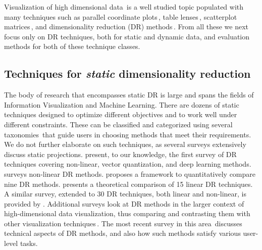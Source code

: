 
Visualization of high dimensional data\,\citep{Liu2017} is a well studied topic populated with many techniques such as parallel coordinate plots\,\citep{Inselberg1990}, table lenses\,\citep{Rao2003}, scatterplot matrices\,\citep{Becker1996}, and dimensionality reduction (DR) methods\,\citep{Nonato2019,vanderMaaten2009,Espadoto19}. From all these we next focus only on DR techniques, both for static and dynamic data, and evaluation methods for both of these technique classes.

\subsection{Techniques for \textit{static} dimensionality reduction}
%
The body of research that encompasses static DR is large and spans the fields of Information Visualization and Machine Learning. There are dozens of static techniques designed to optimize different objectives and to work well under different constraints. These can be classified and categorized using several taxonomies\,\citep{vanderMaaten2009} that guide users in choosing methods that meet their requirements. We do not further elaborate on such techniques, as several surveys extensively discuss static projections. \cite{fodor02_survey} present, to our knowledge, the first survey of DR techniques covering non-linear, vector quantization, and deep learning methods. \cite{yin07_survey} surveys non-linear DR methods. \cite{bunte11} proposes a framework to quantitatively compare nine DR methods. \cite{cunningham15_survey} presents a theoretical comparison of 15 linear DR techniques. A similar survey, extended to 30 DR techniques, both linear and non-linear, is provided by \cite{sorzano14_survey}. Additional surveys look at DR methods in the larger context of high-dimensional data visualization, thus comparing and contrasting them with other visualization techniques\,\citep{buja96,hoffman02,engel12,kehrer13}. The most recent survey in this area\,\citep{Nonato2019} discusses technical aspects of DR methods, and also how such methods satisfy various user-level tasks.

